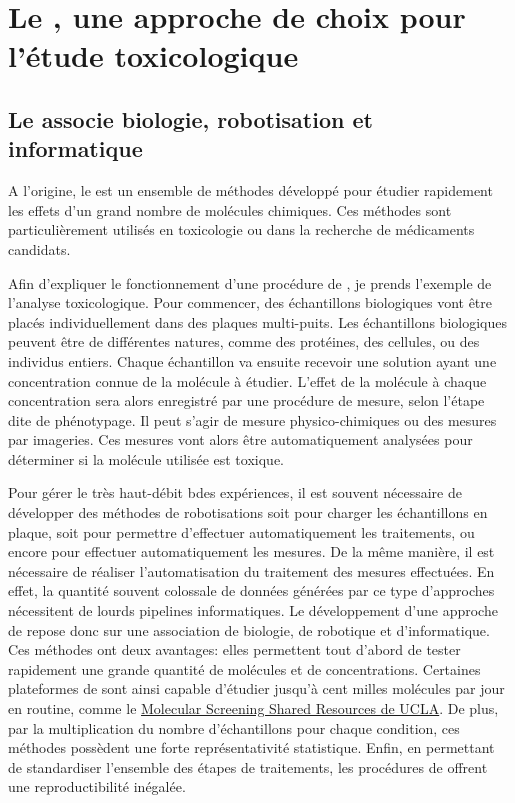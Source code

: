 \documentclass[\main/main.tex]{subfiles}
\begin{document}
            
\section{Le \hcs{}, une approche de choix pour l'étude toxicologique}

    \subsection{Le \hcs{} associe biologie, robotisation et informatique}
    
%
A l'origine, le \hcs{} est un ensemble de méthodes développé pour étudier rapidement les effets d'un grand nombre de molécules chimiques.
%
Ces méthodes sont particulièrement utilisés en toxicologie\cite{na_2016} ou dans la recherche de médicaments candidats\cite{macarron_2011}.

%
Afin d'expliquer le fonctionnement d'une procédure de \hcs{}, je prends l'exemple de l'analyse toxicologique.
%
Pour commencer, des échantillons biologiques vont être placés individuellement dans des plaques multi-puits.
%
Les échantillons biologiques peuvent être de différentes natures, comme des protéines, des cellules, ou des individus entiers.
Chaque échantillon va ensuite recevoir une solution ayant une concentration connue de la molécule à étudier.
%
L'effet de la molécule à chaque concentration sera alors enregistré par une procédure de mesure, selon l'étape dite de phénotypage.
%
Il peut s'agir de mesure physico-chimiques ou des mesures par imageries.
%
Ces mesures vont alors être automatiquement analysées pour déterminer si la molécule utilisée est toxique.

%
Pour gérer le très haut-débit bdes expériences, il est souvent nécessaire de développer des méthodes de robotisations soit pour charger les échantillons en plaque, soit pour permettre d'effectuer automatiquement les traitements, ou encore pour effectuer automatiquement les mesures.
%
De la même manière, il est nécessaire de réaliser l'automatisation du traitement des mesures effectuées.
%
En effet, la quantité souvent colossale de données générées par ce type d'approches nécessitent de lourds pipelines informatiques.
%
Le développement d'une approche de \hcs{} repose donc sur une association de biologie, de robotique et d'informatique.
%
Ces méthodes ont deux avantages:
%
elles permettent tout d'abord de tester rapidement une grande quantité de molécules et de concentrations.
%
Certaines plateformes de \hcs{} sont ainsi capable d'étudier jusqu'à cent milles molécules par jour en routine,
comme le \href{https://www.mssr.ucla.edu/}{Molecular Screening Shared Resources de UCLA}.
%
De plus, par la multiplication du nombre d'échantillons pour chaque condition, ces méthodes possèdent une forte représentativité statistique.
%
Enfin, en permettant de standardiser l'ensemble des étapes de traitements, les procédures de \hcs{} offrent une reproductibilité inégalée.
\end{document}
